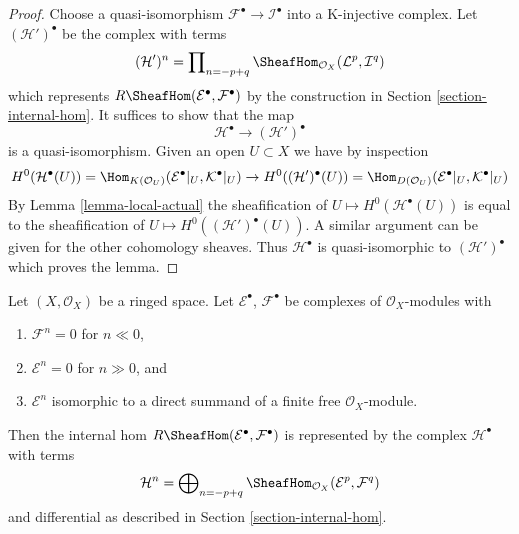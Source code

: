 \begin{proof}
Choose a quasi-isomorphism $\mathcal{F}^\bullet \to \mathcal{I}^\bullet$
into a K-injective complex. Let $(\mathcal{H}')^\bullet$ be the
complex with terms
$$
(\mathcal{H}')^n =
\prod\nolimits_{n = - p + q}
\SheafHom_{\mathcal{O}_X}(\mathcal{L}^p, \mathcal{I}^q)
$$
which represents $R\SheafHom(\mathcal{E}^\bullet, \mathcal{F}^\bullet)$
by the construction in Section \ref{section-internal-hom}. It suffices
to show that the map
$$
\mathcal{H}^\bullet \longrightarrow (\mathcal{H}')^\bullet
$$
is a quasi-isomorphism. Given an open $U \subset X$ we have
by inspection
$$
H^0(\mathcal{H}^\bullet(U)) =
\Hom_{K(\mathcal{O}_U)}(\mathcal{E}^\bullet|_U, \mathcal{K}^\bullet|_U)
\to
H^0((\mathcal{H}')^\bullet(U)) =
\Hom_{D(\mathcal{O}_U)}(\mathcal{E}^\bullet|_U, \mathcal{K}^\bullet|_U)
$$
By Lemma \ref{lemma-local-actual} the sheafification of
$U \mapsto H^0(\mathcal{H}^\bullet(U))$
is equal to the sheafification of
$U \mapsto H^0((\mathcal{H}')^\bullet(U))$. A similar argument can be
given for the other cohomology sheaves. Thus $\mathcal{H}^\bullet$
is quasi-isomorphic to $(\mathcal{H}')^\bullet$ which proves the lemma.
\end{proof}

\begin{lemma}
\label{lemma-Rhom-complex-of-direct-summands-finite-free}
Let $(X, \mathcal{O}_X)$ be a ringed space.
Let $\mathcal{E}^\bullet$, $\mathcal{F}^\bullet$ be complexes
of $\mathcal{O}_X$-modules with
\begin{enumerate}
\item $\mathcal{F}^n = 0$ for $n \ll 0$,
\item $\mathcal{E}^n = 0$ for $n \gg 0$, and
\item $\mathcal{E}^n$ isomorphic to a direct summand of a finite
free $\mathcal{O}_X$-module.
\end{enumerate}
Then the internal hom $R\SheafHom(\mathcal{E}^\bullet, \mathcal{F}^\bullet)$
is represented by the complex $\mathcal{H}^\bullet$ with terms
$$
\mathcal{H}^n =
\bigoplus\nolimits_{n = - p + q}
\SheafHom_{\mathcal{O}_X}(\mathcal{E}^p, \mathcal{F}^q)
$$
and differential as described in Section \ref{section-internal-hom}.
\end{lemma}

